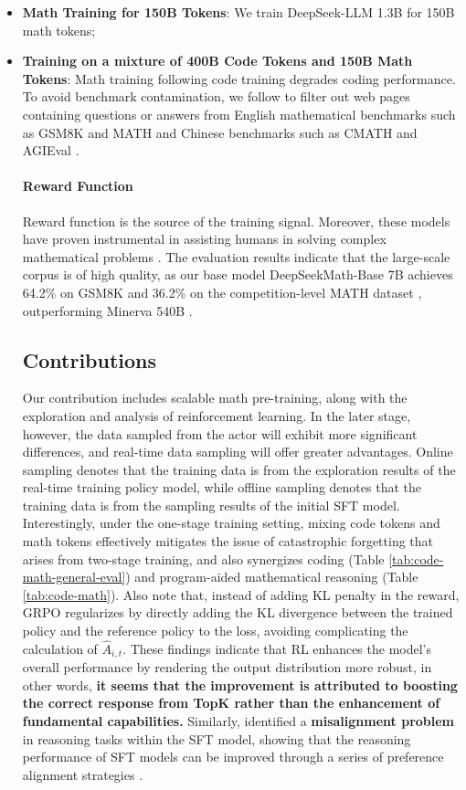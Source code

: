 \begin{itemize}[topsep=0pt]
\begin{itemize}[topsep=0pt]
    \item \textbf{Math Training for 150B Tokens}: We train DeepSeek-LLM 1.3B for 150B math tokens;
    \item \textbf{Training on a mixture of 400B Code Tokens and 150B Math Tokens}: Math training following code training degrades coding performance. To avoid benchmark contamination, we follow \cite{deepseek-coder} to filter out web pages containing questions or answers from English mathematical benchmarks such as GSM8K \citep{gsm8k} and MATH \citep{MATH} and Chinese benchmarks such as CMATH \citep{wei2023cmath} and AGIEval \citep{agieval}. \paragraph{Reward Function} Reward function is the source of the training signal. Moreover, these models have proven instrumental in assisting humans in solving complex mathematical problems \citep{tao}. The evaluation results indicate that the large-scale corpus is of high quality, as our base model DeepSeekMath-Base 7B achieves 64.2\% on GSM8K \citep{gsm8k} and 36.2\% on the competition-level MATH dataset \citep{MATH}, outperforming Minerva 540B \citep{minerva}. \subsection{Contributions}
Our contribution includes scalable math pre-training, along with the exploration and analysis of reinforcement learning. In the later stage, however, the data sampled from the actor will exhibit more significant differences, and real-time data sampling will offer greater advantages. Online sampling denotes that the training data is from the exploration results of the real-time training policy model, while offline sampling denotes that the training data is from the sampling results of the initial SFT model. Interestingly, under the one-stage training setting, mixing code tokens and math tokens effectively mitigates the issue of catastrophic forgetting that arises from two-stage training, and also synergizes coding (Table \ref{tab:code-math-general-eval}) and program-aided mathematical reasoning (Table \ref{tab:code-math}).  Also note that, instead of adding KL penalty in the reward, GRPO regularizes by directly adding the KL divergence between the trained policy and the reference policy to the loss, avoiding complicating the calculation of  $\hat{A}_{i,t}$. These findings indicate that RL enhances the model's overall performance by rendering the output distribution more robust, in other words, \textbf{it seems that the improvement is attributed to boosting the correct response from TopK rather than the enhancement of fundamental capabilities.} Similarly, \citep{wang2023making} identified a \textbf{misalignment problem} in reasoning tasks within the SFT model, showing that the reasoning performance of SFT models can be improved through a series of preference alignment strategies \citep{yuan2023rrhf,song2023preference,wang2023making}. \end{itemize}


\end{itemize}
